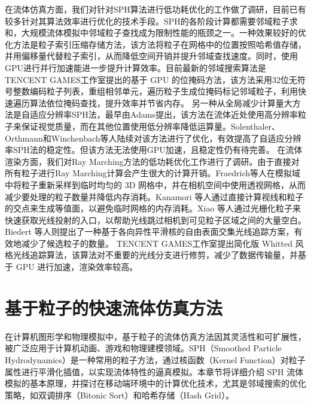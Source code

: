 \indent 在流体仿真方面，我们对针对SPH算法进行低功耗优化的工作做了调研，目前已有较多针对其算法效率进行优化的技术手段。SPH的各阶段计算都需要邻域粒子求和，大规模流体模拟中邻域粒子查找成为限制性能的瓶颈之一。一种效果较好的优化方法是粒子索引压缩存储方法\cite{band2020compressed, horvath2012real, winchenbach2020multi}，该方法将粒子在网格中的位置按照哈希值存储，并用偏移量代替粒子索引，从而降低空间开销并提升邻域查找速度。同时，使用GPU进行并行加速能进一步提升计算效率。目前最新的邻域搜索算法是TENCENT GAMES工作室\cite{liu2023building}提出的基于 GPU 的位掩码方法，该方法采用32位无符号整数编码粒子列表，重组相邻单元，遍历粒子生成位掩码标记邻域粒子，利用快速遍历算法依位掩码查找，提升效率并节省内存。
\newline
\indent 另一种从全局减少计算量大方法是自适应分辨率SPH法，最早由Adams\cite{adams2007adaptively}提出，该方法在流体近处使用高分辨率粒子来保证视觉质量，而在其他位置使用低分辨率降低运算量。Solenthaler\cite{solenthaler2011two}、Orthmann\cite{orthmann2012temporal}和Winchenbach\cite{winchenbach2021optimized}等人陆续对该方法进行了优化，有效提高了自适应分辨率SPH法的稳定性。但该方法无法使用GPU加速，且稳定性仍有待完善。
\newline
\indent
在流体渲染方面，我们对Ray Marching方法的低功耗优化工作进行了调研。由于直接对所有粒子进行Ray Marching计算会产生很大的计算开销。Fraedrich等人\cite{fraedrich2010efficient}在模拟域中将粒子重新采样到临时均匀的 3D 网格中，并在相机空间中使用透视网格，从而减少要处理的粒子数量并降低内存消耗。Kanamori 等人\cite{kanamori2008gpu}通过直接计算视线和粒子的交点来生成等值面，以避免临时网格的内存消耗。Xiao 等人\cite{xiao2017real}通过光栅化粒子来快速获取光线投射的入口，以帮助光线跳过相机到可见粒子区域之间的大量空白。Biedert 等人\cite{biedert2018direct}则提出了一种基于各向异性平滑核的自由表面交集光线追踪方案，有效地减少了候选粒子的数量。
TENCENT GAMES工作室\cite{liu2023building}提出简化版 Whitted 风格光线追踪算法，该算法对不重要的光线分支进行修剪，减少了数据传输量，并基于 GPU 进行加速，渲染效率较高。

% 

\chapter{基于粒子的快速流体仿真方法}

在计算机图形学和物理模拟中，基于粒子的流体仿真方法因其灵活性和可扩展性，被广泛应用于计算机动画、游戏和物理建模领域。SPH（Smoothed Particle Hydrodynamics）是一种常用的粒子方法，通过核函数（Kernel Function）对粒子属性进行平滑化插值，以实现流体特性的逼真模拟。本章节将详细介绍 SPH 流体模拟的基本原理，并探讨在移动端环境中的计算优化技术，尤其是邻域搜索的优化策略，如双调排序（Bitonic Sort）和哈希存储（Hash Grid）。

